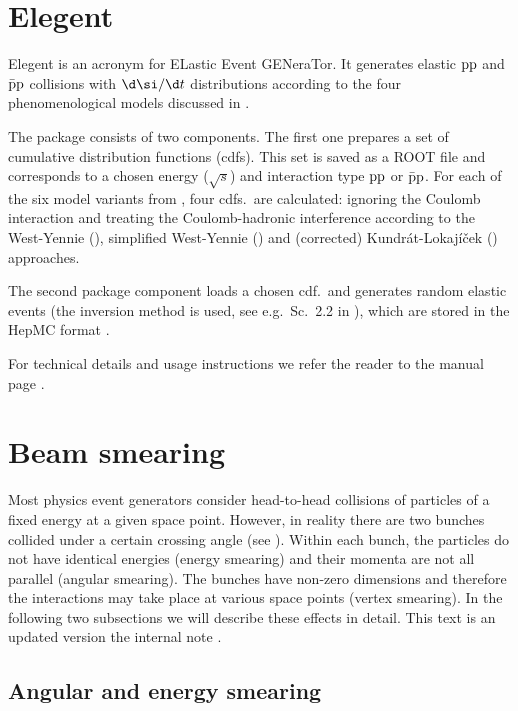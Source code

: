 \section[elegent]{Elegent}

Elegent is an acronym for ELastic Event GENeraTor. It generates elastic $\rm pp$ and $\rm\bar pp$ collisions with $\d\si/\d t$ distributions according to the four phenomenological models discussed in .

The package consists of two components. The first one prepares a set of cumulative distribution functions (cdfs). This set is saved as a ROOT file and corresponds to a chosen energy ($\sqrt s$) and interaction type $\rm pp$ or $\rm \bar pp$. For each of the six model variants from , four cdfs.~are calculated: ignoring the Coulomb interaction and treating the Coulomb-hadronic interference according to the West-Yennie (), simplified West-Yennie () and (corrected) Kundr\' at-Lokaj\' i\v cek () approaches.

The second package component loads a chosen cdf.~and generates random elastic events (the inversion method is used, see e.g.~Sc.~2.2 in ), which are stored in the HepMC format .

For technical details and usage instructions we refer the reader to the manual page .



\section[beam smearing]{Beam smearing}

Most physics event generators consider head-to-head collisions of particles of a fixed energy at a given space point. However, in reality there are two bunches collided under a certain crossing angle (see ). Within each bunch, the particles do not have identical energies (energy smearing) and their momenta are not all parallel (angular smearing). The bunches have non-zero dimensions and therefore the interactions may take place at various space points (vertex smearing). In the following two subsections we will describe these effects in detail. This text is an updated version the internal note .


\subsection{Angular and energy smearing}

